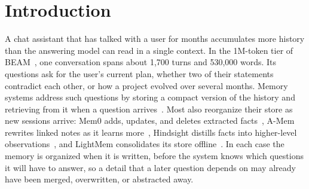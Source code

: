 \section{Introduction}
\label{sec:intro}

A chat assistant that has talked with a user for months accumulates more history than the answering model can
read in a single context. In the 1M-token tier of BEAM~\citep{tavakoli2025beam}, one conversation spans about
1,700 turns and 530,000 words. Its questions ask for the user's current plan, whether two of their statements
contradict each other, or how a project evolved over several months. Memory systems address such questions by
storing a compact version of the history and retrieving from it when a question
arrives~\citep{packer2023memgpt,chhikara2025mem0,wu2025longmemeval}. Most also reorganize their store as new
sessions arrive: Mem0 adds, updates, and deletes extracted facts~\citep{chhikara2025mem0}, A-Mem rewrites linked
notes as it learns more~\citep{xu2025amem}, Hindsight distills facts into higher-level
observations~\citep{latimer2025hindsight}, and LightMem consolidates its store offline~\citep{fang2025lightmem}.
In each case the memory is organized when it is written, before the system knows which questions it will have to
answer, so a detail that a later question depends on may already have been merged, overwritten, or abstracted
away.

